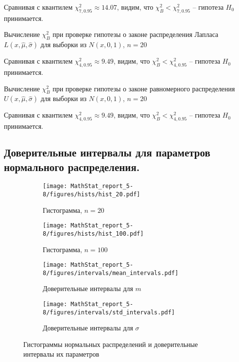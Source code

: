 \documentclass[12pt]{article}
\begin{document}
	Сравнивая с квантилем $\chi^2_{7, 0.95} \approx 14.07$, видим, что  $\chi^2_B < \chi^2_{7, 0.95}$ -- гипотеза $H_0$ принимается.
	
	\begin{table}[H]
		\centering
		
		\caption{Вычисление $\chi^2_B$ при проверке гипотезы о законе распределения Лапласа $L(x, \widehat{\mu}, \widehat{\sigma})$ для выборки из $N(x, 0, 1)$, $n = 20$}
	\end{table}
	
	Сравнивая с квантилем $\chi^2_{4, 0.95} \approx 9.49$, видим, что  $\chi^2_B < \chi^2_{4, 0.95}$ -- гипотеза $H_0$ принимается.
	
	\begin{table}[H]
		\centering
		
		\caption{Вычисление $\chi^2_B$ при проверке гипотезы о законе равномерного распределения $U(x, \widehat{\mu}, \widehat{\sigma})$ для выборки из $N(x, 0, 1)$, $n = 20$}
	\end{table}
	
	Сравнивая с квантилем $\chi^2_{4, 0.95} \approx 9.49$, видим, что  $\chi^2_B < \chi^2_{4, 0.95}$ -- гипотеза $H_0$ принимается.
	
	\subsection{Доверительные интервалы для параметров нормального распределения.}
	
	\begin{figure}[H]
		\centering
		\begin{subfigure}[t]{.45\linewidth}
			\centering\texttt{[image: MathStat\_report\_5-8/figures/hists/hist\_20.pdf]}
			\caption*{Гистограмма, $n=20$}
		\end{subfigure}
		\begin{subfigure}[t]{.45\linewidth}
			\centering\texttt{[image: MathStat\_report\_5-8/figures/hists/hist\_100.pdf]}
			\caption*{Гистограмма, $n=100$}
		\end{subfigure}
		\begin{subfigure}[t]{.45\linewidth}
			\centering\texttt{[image: MathStat\_report\_5-8/figures/intervals/mean\_intervals.pdf]}
			\caption*{Доверительные интервалы для $m$}
		\end{subfigure}
		\begin{subfigure}[t]{.45\linewidth}
			\centering\texttt{[image: MathStat\_report\_5-8/figures/intervals/std\_intervals.pdf]}
			\caption*{Доверительные интервалы для $\sigma$}
		\end{subfigure}
		\caption{Гистограммы нормальных распределений и доверительные интервалы их параметров}
	\end{figure}
	
\end{document}
